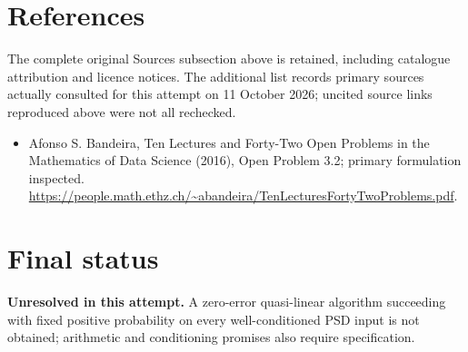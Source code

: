 \documentclass[11pt]{article}
\begin{document}
\section{References}
The complete original Sources subsection above is retained, including catalogue attribution and licence notices. The additional list records primary sources actually consulted for this attempt on 11 October 2026; uncited source links reproduced above were not all rechecked.
\begin{itemize}
\item Afonso S. Bandeira, Ten Lectures and Forty-Two Open Problems in the Mathematics of Data Science (2016), Open Problem 3.2; primary formulation inspected. \url{https://people.math.ethz.ch/~abandeira/TenLecturesFortyTwoProblems.pdf}.
\end{itemize}
\section{Final status}
\textbf{Unresolved in this attempt.} A zero-error quasi-linear algorithm succeeding with fixed positive probability on every well-conditioned PSD input is not obtained; arithmetic and conditioning promises also require specification.
\end{document}
